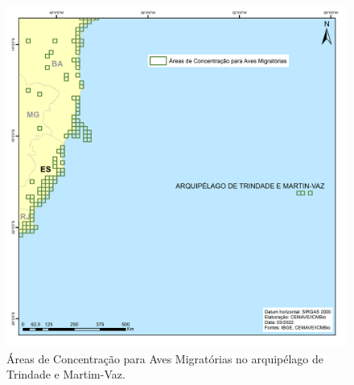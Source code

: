 \documentclass[
  oneside]{scrbook}
\begin{document}
\begin{figure}[H]

{\centering \includegraphics[width=0.75\linewidth]{imagens/cap07/Figura_7.40_Trindade_M_Vaz} 

}

\caption{Áreas de Concentração para Aves Migratórias no arquipélago de Trindade e Martim-Vaz.}\label{fig:60}
\end{figure}
\end{document}
